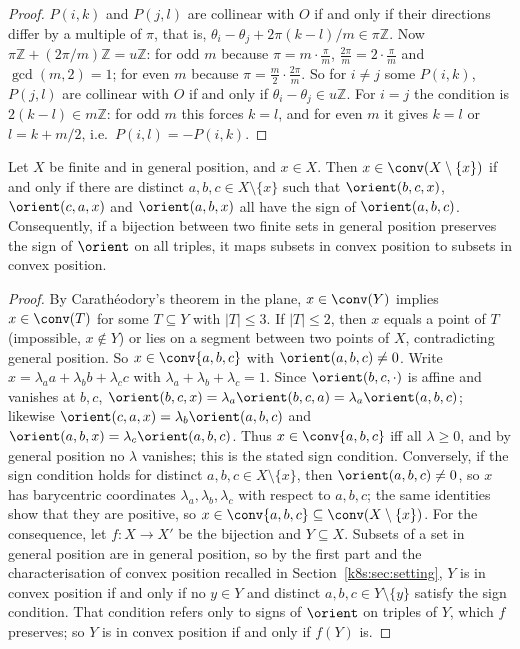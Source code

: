\begin{proof}
$P(i,k)$ and $P(j,l)$ are collinear with $O$ if and only if their directions differ by a multiple of $\pi$, that is,
$\theta_i-\theta_j+2\pi(k-l)/m\in\pi\mathbb Z$. Now $\pi\mathbb Z+(2\pi/m)\mathbb Z=u\mathbb Z$: for odd $m$ because
$\pi=m\cdot\frac{\pi}{m}$, $\frac{2\pi}{m}=2\cdot\frac\pi m$ and $\gcd(m,2)=1$; for even $m$ because
$\pi=\frac m2\cdot\frac{2\pi}m$. So for $i\ne j$ some $P(i,k)$, $P(j,l)$ are collinear with $O$ if and only if
$\theta_i-\theta_j\in u\mathbb Z$. For $i=j$ the condition is $2(k-l)\in m\mathbb Z$: for odd $m$ this forces $k=l$, and for
even $m$ it gives $k=l$ or $l=k+m/2$, i.e.\ $P(i,l)=-P(i,k)$.
\end{proof}

\begin{lemma}\label{k8s:lem:convpos}
Let $X$ be finite and in general position, and $x\in X$. Then $x\in\conv(X\setminus\{x\})$ if and only if there are
distinct $a,b,c\in X\setminus\{x\}$ such that $\orient(b,c,x)$, $\orient(c,a,x)$ and $\orient(a,b,x)$ all have the sign
of $\orient(a,b,c)$. Consequently, if a bijection between two finite sets in general position preserves the sign of
$\orient$ on all triples, it maps subsets in convex position to subsets in convex position.
\end{lemma}

\begin{proof}
By Carath\'eodory's theorem in the plane, $x\in\conv(Y)$ implies $x\in\conv(T)$ for some $T\subseteq Y$ with
$|T|\le3$. If $|T|\le2$, then $x$ equals a point of $T$ (impossible, $x\notin Y$) or lies on a segment between two
points of $X$, contradicting general position. So $x\in\conv\{a,b,c\}$ with $\orient(a,b,c)\ne0$. Write
$x=\lambda_aa+\lambda_bb+\lambda_cc$ with $\lambda_a+\lambda_b+\lambda_c=1$. Since $\orient(b,c,\cdot)$ is affine and
vanishes at $b,c$, $\orient(b,c,x)=\lambda_a\orient(b,c,a)=\lambda_a\orient(a,b,c)$; likewise
$\orient(c,a,x)=\lambda_b\orient(a,b,c)$ and $\orient(a,b,x)=\lambda_c\orient(a,b,c)$. Thus $x\in\conv\{a,b,c\}$ iff all
$\lambda\ge0$, and by general position no $\lambda$ vanishes; this is the stated sign condition. Conversely, if the
sign condition holds for distinct $a,b,c\in X\setminus\{x\}$, then $\orient(a,b,c)\ne0$, so $x$ has barycentric
coordinates $\lambda_a,\lambda_b,\lambda_c$ with respect to $a,b,c$; the same identities show that they are positive,
so $x\in\conv\{a,b,c\}\subseteq\conv(X\setminus\{x\})$. For the consequence, let $f:X\to X'$ be the bijection and
$Y\subseteq X$. Subsets of a set in general position are in general position, so by the first part and the
characterisation of convex position recalled in Section~\ref{k8s:sec:setting}, $Y$ is in convex position if and only if
no $y\in Y$ and distinct $a,b,c\in Y\setminus\{y\}$ satisfy the sign condition. That condition refers only to signs of
$\orient$ on triples of $Y$, which $f$ preserves; so $Y$ is in convex position if and only if $f(Y)$ is.
\end{proof}

